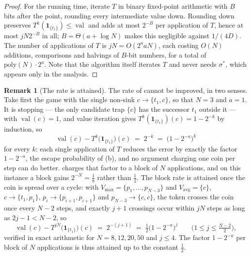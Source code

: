 \documentclass[11pt]{article}
\theoremstyle{plain}
\theoremstyle{definition}
\newtheorem{remark}[theorem]{Remark}
\DeclareMathOperator{\val}{val}
\newcommand{\Vmax}{V_{\max}}
\newcommand{\Vavg}{V_{\mathrm{avg}}}
\newcommand{\bbone}{\mathbf{1}}
\begin{document}
\begin{proof}
For the running time, iterate $T$ in binary fixed-point arithmetic with
$B$ bits after the point, rounding every intermediate value down.
Rounding down preserves $T^{k}(\bbone_{\{t_1\}})\le\val$ and adds at most
$2^{-B}$ per application of $T$, hence at most $jN2^{-B}$ in all;
$B=\Theta(a+\log N)$ makes this negligible against $1/(4D)$. The number of
applications of $T$ is $jN=O(2^{a}aN)$, each costing $O(N)$ additions,
comparisons and halvings of $B$-bit numbers, for a total of
$\mathrm{poly}(N)\cdot2^{a}$. Note that the algorithm itself iterates $T$
and never needs $\sigma^\ast$, which appears only in the analysis.
\end{proof}

\begin{remark}[The rate is attained]\label{rem:few-avg-tight}
The rate of  cannot be improved, in two senses. Take
first the game with the single non-sink $c\to\{t_1,c\}$, so that $N=3$
and $a=1$. It is stopping --- the only candidate trap $\{c\}$ has the
successor $t_1$ outside it --- with $\val(c)=1$, and value iteration
gives $T^{k}(\bbone_{\{t_1\}})(c)=1-2^{-k}$ by induction, so
\[
  \val(c)-T^{k}\bigl(\bbone_{\{t_1\}}\bigr)(c)\;=\;2^{-k}\;=\;\bigl(1-2^{-a}\bigr)^{k}
\]
for every $k$: each single application of $T$ reduces the error by
exactly the factor $1-2^{-a}$, the escape probability of
(b), and no argument charging one coin per step can do
better.  charges that factor to a block of $N$
applications, and on this instance a block gains $2^{-N}=\tfrac18$ rather
than $\tfrac12$. The block rate is attained once the coin is spread over
a cycle: with $\Vmax=\{p_1,\dots,p_{N-3}\}$ and $\Vavg=\{c\}$,
$c\to\{t_1,p_1\}$, $p_i\to\{p_{i+1},p_{i+1}\}$ and $p_{N-3}\to\{c,c\}$,
the token crosses the coin once every $N-2$ steps, and exactly $j+1$
crossings occur within $jN$ steps as long as $2j-1<N-2$, so
\[
  \val(c)-T^{jN}\bigl(\bbone_{\{t_1\}}\bigr)(c)\;=\;2^{-(j+1)}
  \;=\;\tfrac12\bigl(1-2^{-a}\bigr)^{j}\qquad\bigl(1\le j\le\tfrac{N-2}2\bigr),
\]
verified in exact arithmetic for $N=8,12,20,50$ and $j\le4$. The factor
$1-2^{-a}$ per block of $N$ applications is thus attained up to the
constant $\tfrac12$.
\end{remark}
\end{document}
